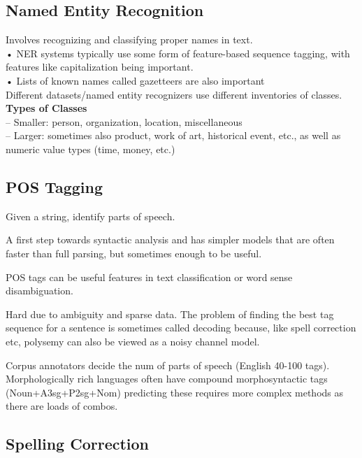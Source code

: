 \documentclass[8pt]{extarticle} %
\begin{document}
\begin{multicols*}{3}
\subsection*{Named Entity Recognition}
Involves recognizing and classifying proper names in text.\\
• NER systems typically use some form of feature-based sequence tagging, with features like capitalization being important.\\
• Lists of known names called gazetteers are also important\\

Different datasets/named entity recognizers use different inventories of classes.\\

\textbf{Types of Classes}\\
– Smaller: person, organization, location, miscellaneous\\
– Larger: sometimes also product, work of art, historical event, etc., as well as numeric value types (time, money, etc.)\\

\subsection*{POS Tagging}
Given a string, identify parts of speech.

A first step towards syntactic analysis and has simpler models that are often faster than full parsing, but sometimes enough to be useful.

POS tags can be useful features in text classification or word sense disambiguation. 

Hard due to ambiguity and sparse data. The problem of finding the best tag sequence for a sentence is sometimes called
decoding because, like spell correction etc, polysemy can also be viewed as a noisy channel model.

Corpus annotators decide the num of parts of speech (English 40-100 tags). \\

Morphologically rich languages often have compound morphosyntactic tags (Noun+A3sg+P2sg+Nom) predicting these requires more complex methods as there are loads of combos. 

\subsection*{Spelling Correction}


\end{multicols*}
\end{document}
